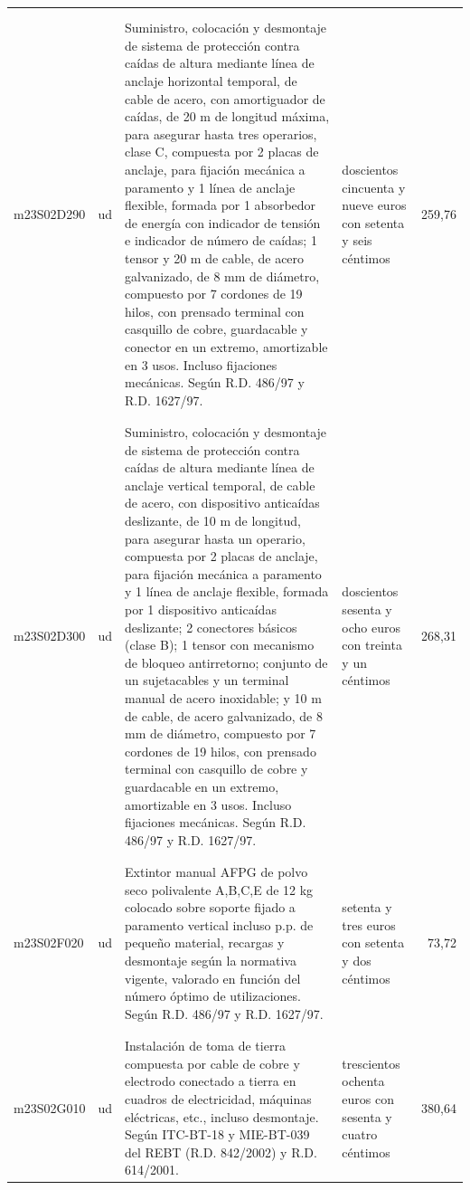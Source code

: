 \documentclass{book}%
\begin{document}
\begin{supertabular}{|l|l|p{5cm}|p{3cm}|r|}
&&&&\\%
&&&&\\%
m23S02D290&ud&Suministro, colocación y desmontaje de sistema de protección contra caídas de altura mediante línea de anclaje horizontal temporal, de cable de acero, con amortiguador de caídas, de 20 m de longitud máxima, para asegurar hasta tres operarios, clase C, compuesta por 2 placas de anclaje, para fijación mecánica a paramento y 1 línea de anclaje flexible, formada por 1 absorbedor de energía con indicador de tensión e indicador de número de caídas; 1 tensor y 20 m de cable, de acero galvanizado, de 8 mm de diámetro, compuesto por 7 cordones de 19 hilos, con prensado terminal con casquillo de cobre, guardacable y conector en un extremo, amortizable en 3 usos. Incluso fijaciones mecánicas. Según R.D. 486/97 y R.D. 1627/97.&doscientos cincuenta y nueve euros con setenta y seis céntimos&259,76\\%
&&&&\\%
&&&&\\%
m23S02D300&ud&Suministro, colocación y desmontaje de sistema de protección contra caídas de altura mediante línea de anclaje vertical temporal, de cable de acero, con dispositivo anticaídas deslizante, de 10 m de longitud, para asegurar hasta un operario, compuesta por 2 placas de anclaje, para fijación mecánica a paramento y 1 línea de anclaje flexible, formada por 1 dispositivo anticaídas deslizante; 2 conectores básicos (clase B); 1 tensor con mecanismo de bloqueo antirretorno; conjunto de un sujetacables y un terminal manual de acero inoxidable; y 10 m de cable, de acero galvanizado, de 8 mm de diámetro, compuesto por 7 cordones de 19 hilos, con prensado terminal con casquillo de cobre y guardacable en un extremo, amortizable en 3 usos. Incluso fijaciones mecánicas. Según R.D. 486/97 y R.D. 1627/97.&doscientos sesenta y ocho euros con treinta y un céntimos&268,31\\%
&&&&\\%
&&&&\\%
m23S02F020&ud&Extintor manual AFPG de polvo seco polivalente A,B,C,E de 12 kg colocado sobre soporte fijado a paramento vertical incluso p.p. de pequeño material, recargas y desmontaje según la normativa vigente, valorado en función del número óptimo de utilizaciones. Según R.D. 486/97 y R.D. 1627/97.&setenta y tres euros con setenta y dos céntimos&73,72\\%
&&&&\\%
&&&&\\%
m23S02G010&ud&Instalación de toma de tierra compuesta por cable de cobre y electrodo conectado a tierra en cuadros de electricidad, máquinas eléctricas, etc., incluso desmontaje. Según ITC{-}BT{-}18 y MIE{-}BT{-}039 del REBT (R.D. 842/2002) y R.D. 614/2001.&trescientos ochenta euros con sesenta y cuatro céntimos&380,64\\%

\end{supertabular}
\end{document}
